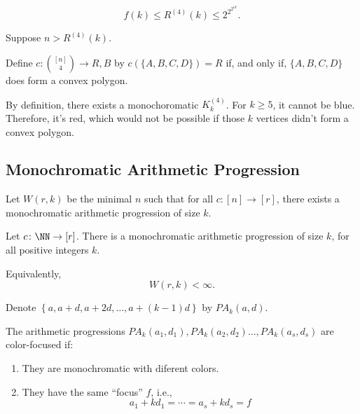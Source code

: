 \begin{thm}
	\[
		f(k) \le R^{(4)}(k) \le 2^{2^{2^{ck}}}.
	\]
\end{thm}

\begin{dem}
	Suppose $n > R^{(4)}(k)$.

	Define $c \colon \binom{[n]}{4} \to {R, B}$ by $c(\{A, B, C, D\}) = R$ if, and only if, $\{A, B, C, D\}$ does form a convex polygon.

	By definition, there exists a monochoromatic $K^{(4)}_k$. For $k \ge 5$, it cannot be blue. Therefore, it's red, which would not be possible if those $k$ vertices didn't form a convex polygon.
\end{dem}

\subsection{Monochromatic Arithmetic Progression}

\begin{defn}
	Let $W(r, k)$ be the minimal $n$ such that for all $c \colon [n] \to [r]$, there exists a monochromatic arithmetic progression of size $k$.
\end{defn}

\begin{thm}\label{thm:vanderwaerden-1927}
	Let $c \colon \NN \to [r]$. There is a monochromatic arithmetic progression of size $k$, for all positive integers $k$.

	Equivalently, \[
		W(r, k) < \infty.
	\]
\end{thm}

\begin{defn}
	Denote $\left\{a, a + d, a + 2d, \dots, a + (k-1)d\right\}$ by  $PA_k(a, d)$.

	The arithmetic progressions  $PA_k(a_1, d_1), PA_k(a_2, d_2) \dots, PA_k(a_s, d_s)$ are color-focused if:
	\begin{enumerate}
		\item They are monochromatic with diferent colors.
		\item They have the same ``focus'' $f$, i.e., \[
			a_1 + kd_1 = \cdots = a_s + kd_s = f
		\]
	\end{enumerate}
\end{defn}

